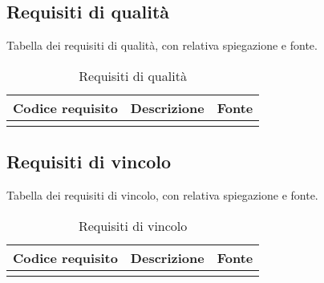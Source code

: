 \subsection{Requisiti di qualità}
Tabella dei requisiti di qualità, con relativa spiegazione e fonte.

\begin{longtabu}{|c|l|c|}

  \hline 

  Codice requisito & Descrizione & Fonte \\ 
  
  \hline

  \caption{Requisiti di qualità}
\end{longtabu}

\subsection{Requisiti di vincolo}
Tabella dei requisiti di vincolo, con relativa spiegazione e fonte.

\begin{longtabu}{|c|l|c|}

  \hline 

  Codice requisito & Descrizione & Fonte \\ 
  
  \hline

  \caption{Requisiti di vincolo}
\end{longtabu}
